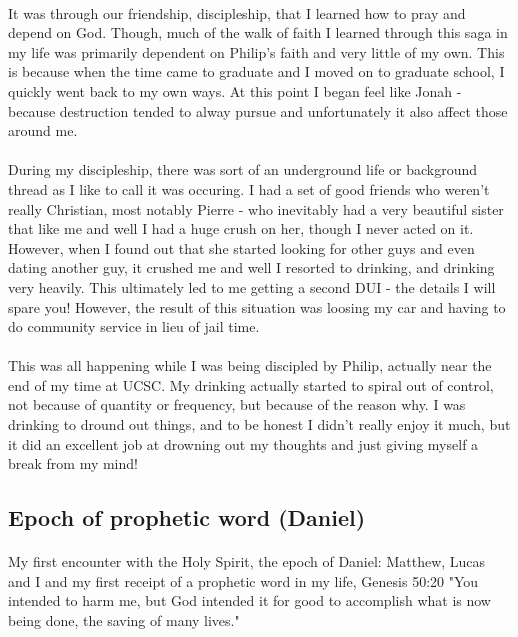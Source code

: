 \documentclass[a4paper]{article}
\begin{document}
\paragraph{}
It was through our friendship, discipleship, that I learned how to pray and depend on
God. Though, much of the walk of faith I learned through this saga in my life was primarily dependent on
Philip's faith and very little of my own. This is because when the time came to graduate and I moved on to
graduate school, I quickly went back to my own ways. At this point I began feel like Jonah - because
destruction tended to alway pursue and unfortunately it also affect those around me.

\paragraph{}
During my discipleship, there was sort of an underground life or background thread as I like to call it was
occuring. I had a set of good friends who weren't really Christian, most notably Pierre - who inevitably had
a very beautiful sister that like me and well I had a huge crush on her, though I never acted on
it. However, when I found out that she started looking for other guys and even dating another guy, it
crushed me and well I resorted to drinking, and drinking very heavily. This ultimately led to me getting a
second DUI - the details I will spare you! However, the result of this situation was loosing my car and
having to do community service in lieu of jail time. 

\paragraph{}
This was all happening while I was being discipled by Philip, actually near the end of my time at UCSC. My
drinking actually started to spiral out of control, not because of quantity or frequency, but because of the
reason why. I was drinking to dround out things, and to be honest I didn't really enjoy it much, but it did
an excellent job at drowning out my thoughts and just giving myself a break from my mind!



\subsection{Epoch of prophetic word (Daniel)}
\label{sec:org5ee40cc}
\paragraph{}
My first encounter with the Holy Spirit, the epoch of Daniel: Matthew, Lucas and I and my first receipt of a
prophetic word in my life, Genesis 50:20 "You intended to harm me, but God intended it for good to
accomplish what is now being done, the saving of many lives."
\end{document}

